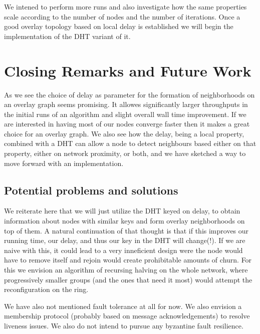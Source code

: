 \documentclass[12pt,notitlepage]{article}
\begin{document}
We intened to perform more runs and also investigate how the same properties scale according to the number of nodes and the number of iterations. Once a good
overlay topology based on local delay is established we will begin the implementation of the DHT variant of it.

\section{Closing Remarks and Future Work}
As we see the choice of delay as parameter for the formation of neighborhoods on an overlay graph seems promising. It allowes significantly larger 
throughputs in the initial runs of an algorithm and slight overall wall time improvement. If we are interested in having most of our nodes converge
faster then it makes a great choice for an overlay graph. We also see how the delay, being a local property, combined with a DHT can allow a node
to detect neighbours based either on that property, either on network proximity, or both, and we have sketched a way to move forward with an implementation.

\subsection{Potential problems and solutions}
We reiterate here that we will just utilize the DHT keyed on delay, to obtain information about nodes with similar keys and form overlay neighborhoods on top 
of them. A natural continuation of that thought is that if this improves our running time, our delay, and thus our key in the DHT will change(!). If we
are naive with this, it could lead to a very inneficient design were the node would have to remove itself and rejoin would create prohibitable amounts of churn.
For this we envision an algorithm of recursing halving on the whole network, where progressively smaller groups (and the ones that need it most) would attempt
the reconfiguration on the ring.

We have also not mentioned fault tolerance at all for now. We also envision a membership protocol (probably based on message acknowledgements) to resolve
liveness issues. We also do not intend to pursue any byzantine fault resilience.



\end{document}
